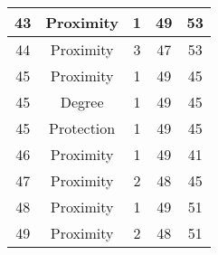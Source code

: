 \documentclass[results.tex]{subfiles}
\begin{document}
\begin{center}
\begin{tabular}{| c || c | c | c | c |}
    \hline
    43 & Proximity & 1 & 49 & 53 \\ 
    \hline
    44 & Proximity & 3 & 47 & 53 \\ 
    \hline
    45 & Proximity & 1 & 49 & 45 \\ 
    \hline
    45 & Degree & 1 & 49 & 45 \\ 
    \hline
    45 & Protection & 1 & 49 & 45 \\ 
    \hline
    46 & Proximity & 1 & 49 & 41 \\ 
    \hline
    47 & Proximity & 2 & 48 & 45 \\ 
    \hline
    48 & Proximity & 1 & 49 & 51 \\ 
    \hline
    49 & Proximity & 2 & 48 & 51 \\ 
    \hline   \end{tabular}
\end{center}
\end{document}
